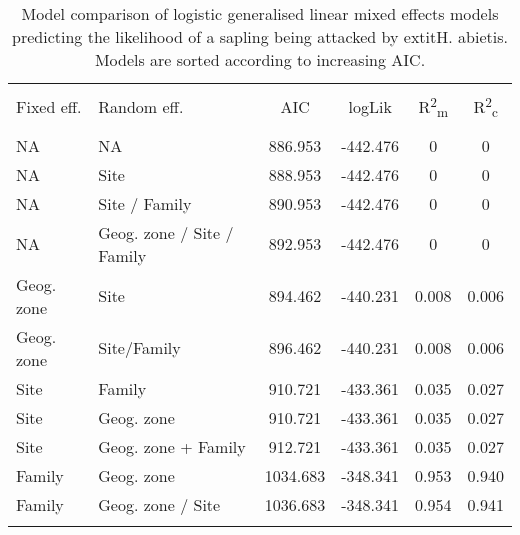 
\begin{table}[!htbp] \centering 
  \caption{Model comparison of logistic generalised linear mixed effects models predicting the likelihood of a sapling being attacked by 	extit{H. abietis}. Models are sorted according to increasing AIC.} 
  \label{binom_comp} 
\begin{tabular}{@{\extracolsep{5pt}} llS[table-format=3.2]S[table-format=3.2]S[table-format=3.2]S[table-format=3.2]} 
\\[-1.8ex]\hline 
\hline \\[-1.8ex] 
{Fixed eff.} & {Random eff.} & {AIC} & {logLik} & {R\textsuperscript{2}\textsubscript{m}} & {R\textsuperscript{2}\textsubscript{c}} \\
\hline \\[-1.8ex] 
NA & NA & 886.953 & -442.476 & 0 & 0 \\ 
NA & Site & 888.953 & -442.476 & 0 & 0 \\ 
NA & Site / Family & 890.953 & -442.476 & 0 & 0 \\ 
NA & Geog. zone / Site / Family & 892.953 & -442.476 & 0 & 0 \\ 
Geog. zone & Site & 894.462 & -440.231 & 0.008 & 0.006 \\ 
Geog. zone & Site/Family & 896.462 & -440.231 & 0.008 & 0.006 \\ 
Site & Family & 910.721 & -433.361 & 0.035 & 0.027 \\ 
Site & Geog. zone & 910.721 & -433.361 & 0.035 & 0.027 \\ 
Site & Geog. zone + Family & 912.721 & -433.361 & 0.035 & 0.027 \\ 
Family & Geog. zone & 1034.683 & -348.341 & 0.953 & 0.940 \\ 
Family & Geog. zone / Site & 1036.683 & -348.341 & 0.954 & 0.941 \\ 
\hline \\[-1.8ex] 
\end{tabular} 
\end{table} 
